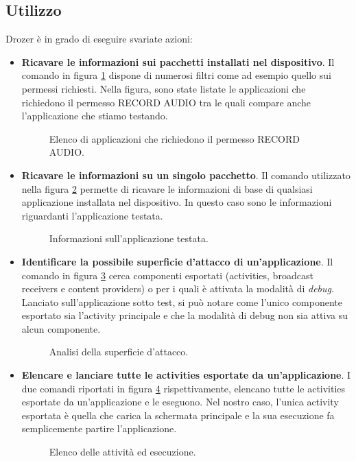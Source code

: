 \subsection{Utilizzo}
Drozer è in grado di eseguire svariate azioni:
\begin{itemize}
	\item \textbf{Ricavare le informazioni sui pacchetti installati nel dispositivo}. Il comando in figura \ref{fig:drozerList} dispone di numerosi filtri come ad esempio quello sui permessi richiesti. Nella figura, sono state listate le applicazioni che richiedono il permesso RECORD AUDIO tra le quali compare anche l'applicazione che stiamo testando.
	\begin{figure}[h]
		\centering 
		\caption{Elenco di applicazioni che richiedono il permesso RECORD AUDIO.}
		\label{fig:drozerList}
	\end{figure}

	\item \textbf{Ricavare le informazioni su un singolo pacchetto}. Il comando utilizzato nella figura \ref{fig:appInfo} permette di ricavare le informazioni di base di qualsiasi applicazione installata nel dispositivo. In questo caso sono le informazioni riguardanti l'applicazione testata.
	\begin{figure}[h]
		\centering 
		\caption{Informazioni sull'applicazione testata.}
		\label{fig:appInfo}
	\end{figure}

	\item \textbf{Identificare la possibile superficie d'attacco di un'applicazione}. Il comando in figura \ref{fig:attackSurface} cerca componenti esportati (activities, broadcast receivers e content providers) o per i quali è attivata la modalità di \emph{debug}. Lanciato sull'applicazione sotto test, si può notare come l'unico componente esportato sia l'activity principale e che la modalità di debug non sia attiva su alcun componente.
	\begin{figure}[h]
		\centering 
		\caption{Analisi della superficie d'attacco.}
		\label{fig:attackSurface}
	\end{figure}

	\item \textbf{Elencare e lanciare tutte le activities esportate da un'applicazione}. I due comandi riportati in figura \ref{fig:activities} rispettivamente, elencano tutte le activities esportate da un'applicazione e le eseguono. Nel nostro caso, l'unica activity esportata è quella che carica la schermata principale e la sua esecuzione fa semplicemente partire l'applicazione. 
	\begin{figure}[h]
		\centering 
		\caption{Elenco delle attività ed esecuzione.}
		\label{fig:activities}
	\end{figure}


\end{itemize}
